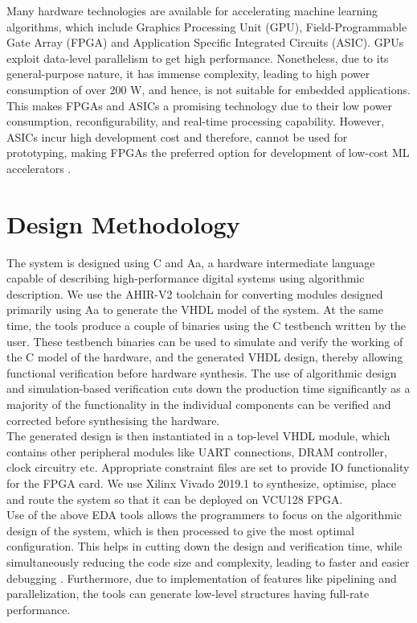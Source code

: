 \documentclass[a4paper,12pt, final]{report}
\begin{document}
Many hardware technologies are available for accelerating machine learning algorithms, which include Graphics Processing Unit (GPU), Field-Programmable Gate Array (FPGA) and Application Specific Integrated Circuits (ASIC). GPUs exploit data-level parallelism to get high performance. Nonetheless, due to its general-purpose nature, it has immense complexity, leading to high power consumption of over 200 W, and hence, is not suitable for embedded applications.
\\

This makes FPGAs and ASICs a promising technology due to their low power consumption, reconfigurability, and real-time processing capability. However, ASICs incur high development cost and therefore, cannot be used for prototyping, making FPGAs the preferred option for development of low-cost ML accelerators \cite{FPGA1,FPGA2,FPGA3}.


\section{Design Methodology}

The system is designed using C and Aa, a hardware intermediate language \cite{ahir} capable of describing high-performance digital systems using algorithmic description. We use the AHIR-V2 toolchain \cite{ahir} for converting modules designed primarily using Aa to generate the VHDL model of the system. At the same time, the tools produce a couple of binaries using the C testbench written by the user. These testbench binaries can be used to simulate and verify the working of the C model of the hardware, and the generated VHDL design, thereby allowing functional verification before hardware synthesis. The use of algorithmic design and simulation-based verification cuts down the production time significantly as a majority of the functionality in the individual components can be verified and corrected before synthesising the hardware.
\\

The generated design is then instantiated in a top-level VHDL module, which contains other peripheral modules like UART connections, DRAM controller, clock circuitry etc. Appropriate constraint files are set to provide IO functionality for the FPGA card. We use Xilinx Vivado 2019.1 to synthesize, optimise, place and route the system so that it can be deployed on VCU128 FPGA.
\\

Use of the above EDA tools allows the programmers to focus on the algorithmic design of the system, which is then processed to give the most optimal configuration. This helps in cutting down the design and verification time, while simultaneously reducing the code size and complexity, leading to faster and easier debugging \cite{FPGA1,FPGA3}. Furthermore, due to implementation of features like pipelining and parallelization, the tools can generate low-level structures having full-rate performance.
\end{document}

